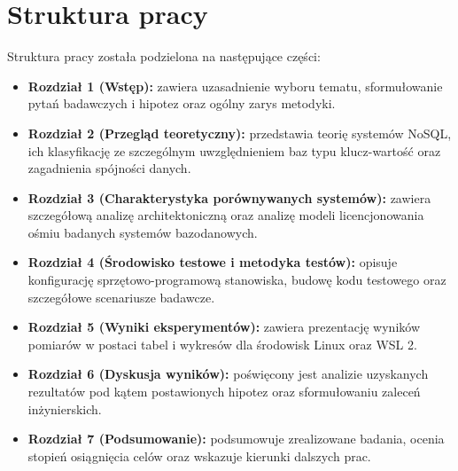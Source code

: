 \section{Struktura pracy}
Struktura pracy została podzielona na następujące części:
\begin{itemize}
    \item \textbf{Rozdział 1 (Wstęp):} zawiera uzasadnienie wyboru tematu, sformułowanie pytań badawczych i hipotez oraz ogólny zarys metodyki.
    \item \textbf{Rozdział 2 (Przegląd teoretyczny):} przedstawia teorię systemów NoSQL, ich klasyfikację ze szczególnym uwzględnieniem baz typu klucz-wartość oraz zagadnienia spójności danych.
    \item \textbf{Rozdział 3 (Charakterystyka porównywanych systemów):} zawiera szczegółową analizę architektoniczną oraz analizę modeli licencjonowania ośmiu badanych systemów bazodanowych.
    \item \textbf{Rozdział 4 (Środowisko testowe i metodyka testów):} opisuje konfigurację sprzętowo-programową stanowiska, budowę kodu testowego oraz szczegółowe scenariusze badawcze.
    \item \textbf{Rozdział 5 (Wyniki eksperymentów):} zawiera prezentację wyników pomiarów w postaci tabel i wykresów dla środowisk Linux oraz WSL 2.
    \item \textbf{Rozdział 6 (Dyskusja wyników):} poświęcony jest analizie uzyskanych rezultatów pod kątem postawionych hipotez oraz sformułowaniu zaleceń inżynierskich.
    \item \textbf{Rozdział 7 (Podsumowanie):} podsumowuje zrealizowane badania, ocenia stopień osiągnięcia celów oraz wskazuje kierunki dalszych prac.
\end{itemize}
